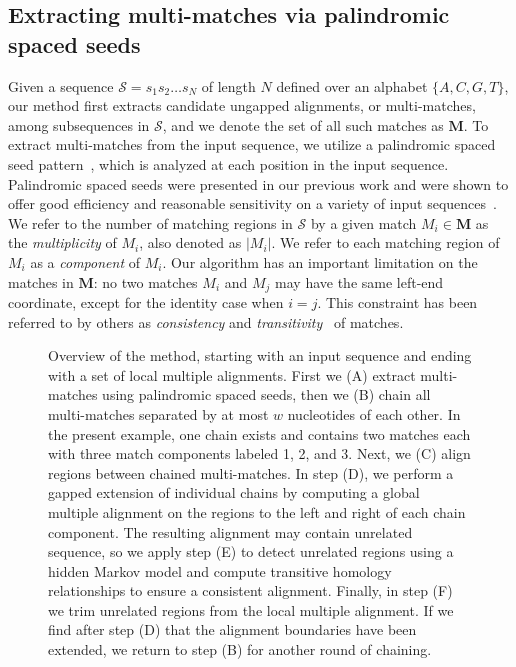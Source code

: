 \documentclass[12pt,journal,letterpaper,onecolumn, draftcls]{IEEEtran}
\begin{document}
\subsection{Extracting multi-matches via palindromic spaced seeds}
Given a sequence $\mathcal{S}=s_1 s_2 \dots s_N$ of length $N$
defined over an alphabet $\{A,C,G,T\}$, our method first extracts candidate ungapped
alignments, or multi-matches, among subsequences in $\mathcal{S}$,
and we denote the set of all such matches as $\mathbf{M}$. To extract multi-matches from the input
sequence, we utilize a palindromic spaced seed pattern~\cite{ref-zhang}, which is
analyzed at each position in the input sequence.
Palindromic spaced seeds were presented in our previous work and were shown to offer good efficiency and
reasonable sensitivity on a variety of input
sequences~\cite{ref-procrast}.  We refer to the number of matching regions
in $\mathcal{S}$ by a given match $M_i \in \mathbf{M}$ as the
\textit{multiplicity} of $M_i$, also denoted as $|M_i|$. We refer to each
matching region of $M_i$ as a \textit{component} of $M_i$. Our
algorithm has an important limitation on the matches in $\mathbf{M}$:
no two matches $M_i$ and $M_j$ may have the same left-end coordinate,
except for the identity case when $i=j$.  This constraint has been
referred to by others as \textit{consistency} and
\textit{transitivity}~\cite{ref-transitivity} of matches.


\begin{figure}[t!]
\begin{center}
\end{center}
\caption
{Overview of the method, starting with an input sequence and ending
with a set of local multiple alignments. First we (A) extract
multi-matches using palindromic spaced seeds,
then we (B) chain all multi-matches separated by at most $w$ nucleotides of each other.  In the present example, one chain exists and
contains two matches each with three match components labeled 1, 2,
and 3.  Next, we (C) align regions between chained
multi-matches.  In step (D), we perform a gapped extension of individual chains by computing
a global multiple alignment on the regions to the left and right of
each chain component.  The resulting alignment may contain unrelated
sequence, so we apply step (E) to detect unrelated regions using a hidden Markov model and
compute transitive homology relationships to ensure a consistent
alignment. Finally, in step (F) we trim unrelated regions from the local multiple alignment.
If we find after step (D) that the alignment boundaries have been
extended, we return to step (B) for another round of chaining.}
\label{fig-main}
\end{figure}
\end{document}
